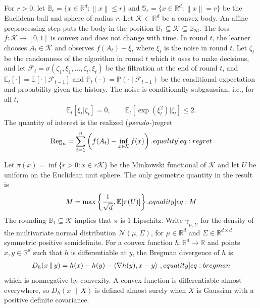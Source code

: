 \documentclass[12pt,cleveref]{jmlr}
\newcommand{\eqlabel}[1]{\label[equality]{#1}}
\newcommand{\R}{\mathbb R}
\newcommand{\E}{\mathbb E}
\newcommand{\Pp}{\mathbb P}
\newcommand{\K}{\mathcal K}
\newcommand{\F}{\mathcal F}
\newcommand{\N}{\mathcal N}
\newcommand{\1}{\mathbf 1}
\newcommand{\ip}[2]{\left\langle #1,#2\right\rangle}
\newcommand{\norm}[1]{\left\lVert #1\right\rVert}
\begin{document}
For $r>0$, let $\mathbb{B}_r=\{x\in\R^d:\norm{x}\leq r\}$
and $\mathbb{S}_r=\{x\in\R^d:\norm{x}=r\}$ be the Euclidean ball and sphere of radius $r$.
Let $\K\subset\R^d$ be a convex body.  An affine preprocessing step puts the body
in the position $\mathbb{B}_1\subseteq\K\subseteq \mathbb{B}_{2d}$.
The loss $f:\K\to[0,1]$ is convex and does not change with time.  In round
$t$, the learner chooses $A_t\in\K$ and observes $f(A_t)+\xi_t$
where $\xi_t$ is the noise in round $t$.
Let $\zeta_t$ be the randomness of the algorithm in round $t$ which it uses to make decisions, and let
$\F_t=\sigma(\zeta_1,\xi_1,\ldots,\zeta_t,\xi_t)$ be the filtration at the end of round $t$,
and $\E_t[\cdot]=\E[\cdot\mid\F_{t-1}]$ and $\Pp_t(\cdot)=\Pp(\cdot\mid\F_{t-1})$ be the conditional expectation and probability given the history.
The noise is conditionally subgaussian, i.e., for all $t$,
\begin{align}
    \E_t[\xi_t|\zeta_t]=0,
    \qquad
    \E_t[\exp(\xi_t^2)|\zeta_t]\leq2.
    \label{eq:noise}
\end{align}
The quantity of interest is the realized (\textit{pseudo-})regret
\begin{align}
    \operatorname{Reg}_n
    =\sum_{t=1}^n\left(f(A_t)-\inf_{x\in\K}f(x)\right).
    \eqlabel{eq:regret}
\end{align}

Let $\pi(x)=\inf\{r>0:x\in r\K\}$ be the Minkowski functional of $\K$ and let
$U$ be uniform on the Euclidean unit sphere.
The only geometric quantity in the result is
\begin{align}
    M=\max\left\{\frac1{\sqrt d},\E[\pi(U)]\right\}.
    \eqlabel{eq:M}
\end{align}
The rounding  $\mathbb{B}_1\subseteq\K$ implies that $\pi$ is $1$-Lipschitz.
Write $\gamma_{\mu,\Sigma}$ for the density of the multivariate normal distribution
$\N(\mu,\Sigma)$, for $\mu\in\R^d$ and $\Sigma\in\R^{d\times d}$ symmetric positive semidefinite.
For a convex function $h:\R^d\to\R$ and points $x,y\in\R^d$ such that $h$ is differentiable at $y$, the Bregman divergence of $h$ is
\begin{align}
    D_h(x\,\|\,y)=h(x)-h(y)-\ip{\nabla h(y)}{x-y}\,,
    \eqlabel{eq:bregman}
\end{align}
which is nonnegative by convexity.
A convex function is differentiable almost everywhere, so $D_h(x\,\|\,X)$ is defined almost surely when $X$ is Gaussian with a positive definite covariance.
\end{document}
